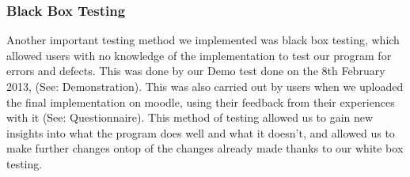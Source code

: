 \subsubsection{Black Box Testing}

Another important testing method we implemented was black box testing,
which allowed users with no knowledge of the implementation to test
our program for errors and defects.
This was done by our Demo test done on the 8th February 2013, (See:
Demonstration).
This was also carried out by users when we uploaded the final
implementation on moodle, using their feedback from their experiences
with it (See: Questionnaire).
This method of testing allowed us to gain new insights into what the
program does well and what it doesn't, and allowed us to make further
changes ontop of the changes already made thanks to our white box
testing.

\newpage




